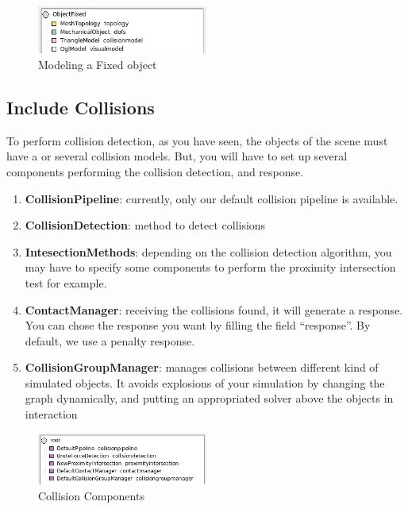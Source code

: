 \begin{figure}[htpb]
	\centering
		\includegraphics[width=0.5\textwidth]{Modelling4.jpg}
	\caption{Modeling a Fixed object}
\end{figure}


\subsection{Include Collisions}
To perform collision detection, as you have seen, the objects of the scene must have a or several collision models. But, you will have to set up several components performing the collision detection, and response.

\begin{enumerate}
 \item { \bf CollisionPipeline}: currently, only our default collision pipeline is available.
 \item { \bf CollisionDetection}: method to detect collisions
 \item { \bf IntesectionMethods}: depending on the collision detection algorithm, you may have to specify some components to perform the proximity intersection test for example.
 \item { \bf ContactManager}: receiving the collisions found, it will generate a response. You can chose the response you want by filling the field ``response''. By default, we use a penalty response.
 \item { \bf CollisionGroupManager}: manages collisions between different kind of simulated objects. It avoids explosions of your simulation by changing the graph dynamically, and putting an appropriated solver above the objects in interaction
\end{enumerate}

\begin{figure}[htpb]
	\centering
		\includegraphics[width=0.5\textwidth]{Modelling5.jpg}
	\caption{Collision Components}
\end{figure}
